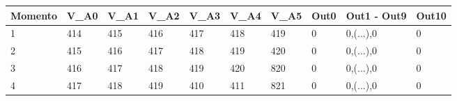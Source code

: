 \begin{tabular}{p{}p{}p{}p{}p{}p{}p{}p{}p{}p{}}

\textbf{Momento}&\textbf{V\_A0}&\textbf{V\_A1}&\textbf{V\_A2}&\textbf{V\_A3}&\textbf{V\_A4}&\textbf{V\_A5}&\textbf{Out0}&\textbf{Out1 - Out9}&\textbf{Out10} \\

\hline
1 & 414 & 415 & 416 & 417 & 418 & 419 & 0 & 0,(...),0 & 0 \\
2 & 415 & 416 & 417 & 418 & 419 & 420 & 0 & 0,(...),0 & 0 \\
3 & 416 & 417 & 418 & 419 & 420 & 820 & 0 & 0,(...),0 & 0 \\
4 & 417 & 418 & 419 & 410 & 411 & 821 & 0 & 0,(...),0 & 0 \\
\hline
\end{tabular}
